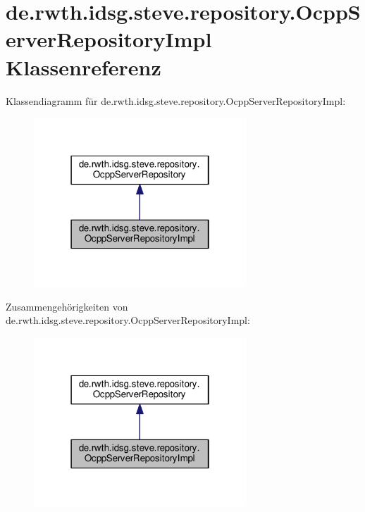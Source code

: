 \hypertarget{classde_1_1rwth_1_1idsg_1_1steve_1_1repository_1_1_ocpp_server_repository_impl}{\section{de.\-rwth.\-idsg.\-steve.\-repository.\-Ocpp\-Server\-Repository\-Impl Klassenreferenz}
\label{classde_1_1rwth_1_1idsg_1_1steve_1_1repository_1_1_ocpp_server_repository_impl}
}


Klassendiagramm für de.\-rwth.\-idsg.\-steve.\-repository.\-Ocpp\-Server\-Repository\-Impl\-:
\nopagebreak
\begin{figure}[H]
\begin{center}
\leavevmode
\includegraphics[width=226pt]{classde_1_1rwth_1_1idsg_1_1steve_1_1repository_1_1_ocpp_server_repository_impl__inherit__graph}
\end{center}
\end{figure}


Zusammengehörigkeiten von de.\-rwth.\-idsg.\-steve.\-repository.\-Ocpp\-Server\-Repository\-Impl\-:
\nopagebreak
\begin{figure}[H]
\begin{center}
\leavevmode
\includegraphics[width=226pt]{classde_1_1rwth_1_1idsg_1_1steve_1_1repository_1_1_ocpp_server_repository_impl__coll__graph}
\end{center}
\end{figure}
